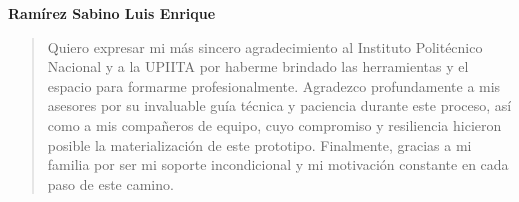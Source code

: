 \noindent \textbf{Ramírez Sabino Luis Enrique}
\begin{quote}
    Quiero expresar mi más sincero agradecimiento al Instituto Politécnico Nacional y a la UPIITA por haberme brindado las herramientas y el espacio para formarme profesionalmente. Agradezco profundamente a mis asesores por su invaluable guía técnica y paciencia durante este proceso, así como a mis compañeros de equipo, cuyo compromiso y resiliencia hicieron posible la materialización de este prototipo. Finalmente, gracias a mi familia por ser mi soporte incondicional y mi motivación constante en cada paso de este camino.
\end{quote}

\vspace{0.5cm}
